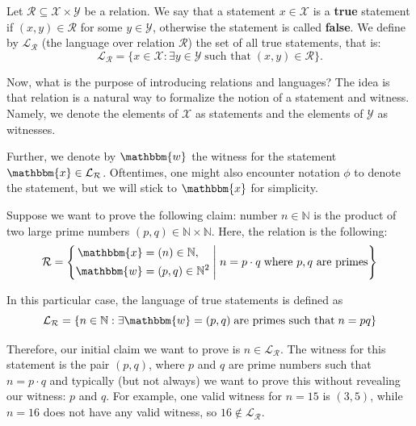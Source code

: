 \documentclass[../../book.tex]{subfiles}
\begin{document}
\begin{definition}
    Let $\mathcal{R} \subseteq \mathcal{X} \times \mathcal{Y}$ be a relation. We
    say that a statement $x \in \mathcal{X}$ is a \textbf{true} statement if
    $(x,y) \in \mathcal{R}$ for some $y \in \mathcal{Y}$, otherwise the
    statement is called \textbf{false}. We define by $\mathcal{L}_{\mathcal{R}}$
    (the language over relation $\mathcal{R}$) the set of all true statements,
    that is:
    \begin{equation*}
        \mathcal{L}_{\mathcal{R}} = \{ x \in \mathcal{X}: \exists y \in \mathcal{Y} \; \text{such that} \; (x,y) \in \mathcal{R} \}.
    \end{equation*}
\end{definition}

Now, what is the purpose of introducing relations and languages? The idea is
that relation is a natural way to formalize the notion of a statement and
witness. Namely, we denote the elements of $\mathcal{X}$ as statements and the
elements of $\mathcal{Y}$ as witnesses.

Further, we denote by $\mathbbm{w}$ the witness for the statement $\mathbbm{x}
\in \mathcal{L}_{\mathcal{R}}$. Oftentimes, one might also encounter notation
$\phi$ to denote the statement, but we will stick to $\mathbbm{x}$ for
simplicity.

\begin{example}
    Suppose we want to prove the following claim: number $n \in \mathbb{N}$ is
    the product of two large prime numbers $(p,q) \in \mathbb{N} \times
    \mathbb{N}$. Here, the relation is the following:
    \begin{equation*}
        \mathcal{R} = \left\{\begin{aligned}
            \mathbbm{x} &= (n) \in \mathbb{N}, \\ \mathbbm{w}&=(p,q) \in \mathbb{N}^2
        \end{aligned} \; \middle| \; n = p \cdot q \; \text{where $p,q$ are primes} \right\}
    \end{equation*}

    In this particular case, the language of true statements is defined as 
    \begin{equation*}
        \mathcal{L}_{\mathcal{R}} = \left\{n \in \mathbb{N}: \exists \mathbbm{w}=(p,q) \; \text{are primes such that}\; n = pq\right\}
    \end{equation*}
    
    Therefore, our initial claim we want to prove is $n \in
    \mathcal{L}_{\mathcal{R}}$. The witness for this statement is the pair
    $(p,q)$, where $p$ and $q$ are prime numbers such that $n = p \cdot q$ and
    typically (but not always) we want to prove this without revealing our
    witness: $p$ and $q$. For example, one valid witness for $n = 15$ is
    $(3,5)$, while $n=16$ does not have any valid witness, so $16 \not\in
    \mathcal{L}_{\mathcal{R}}$.
\end{example}
\end{document}

